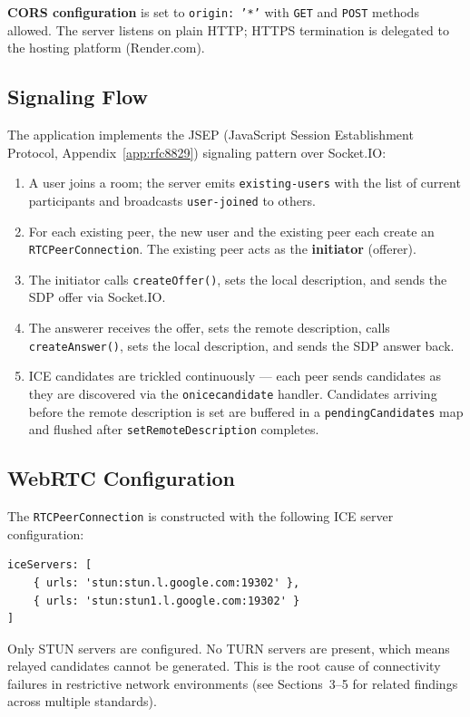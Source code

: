\documentclass[11pt,letterpaper]{article}
\begin{document}
\textbf{CORS configuration} is set to \texttt{origin: '*'} with \texttt{GET} and \texttt{POST} methods allowed. The server listens on plain HTTP; HTTPS termination is delegated to the hosting platform (Render.com).

\subsection{Signaling Flow}

The application implements the JSEP (JavaScript Session Establishment Protocol, Appendix~\ref{app:rfc8829}) signaling pattern over Socket.IO:

\begin{enumerate}[leftmargin=2em]
    \item A user joins a room; the server emits \texttt{existing-users} with the list of current participants and broadcasts \texttt{user-joined} to others.
    \item For each existing peer, the new user and the existing peer each create an \texttt{RTCPeerConnection}. The existing peer acts as the \textbf{initiator} (offerer).
    \item The initiator calls \texttt{createOffer()}, sets the local description, and sends the SDP offer via Socket.IO.
    \item The answerer receives the offer, sets the remote description, calls \texttt{createAnswer()}, sets the local description, and sends the SDP answer back.
    \item ICE candidates are trickled continuously --- each peer sends candidates as they are discovered via the \texttt{onicecandidate} handler. Candidates arriving before the remote description is set are buffered in a \texttt{pendingCandidates} map and flushed after \texttt{setRemoteDescription} completes.
\end{enumerate}

\subsection{WebRTC Configuration}

The \texttt{RTCPeerConnection} is constructed with the following ICE server configuration:

\begin{verbatim}
iceServers: [
    { urls: 'stun:stun.l.google.com:19302' },
    { urls: 'stun:stun1.l.google.com:19302' }
]
\end{verbatim}

Only STUN servers are configured. No TURN servers are present, which means relayed candidates cannot be generated. This is the root cause of connectivity failures in restrictive network environments (see Sections~3--5 for related findings across multiple standards).
\end{document}
